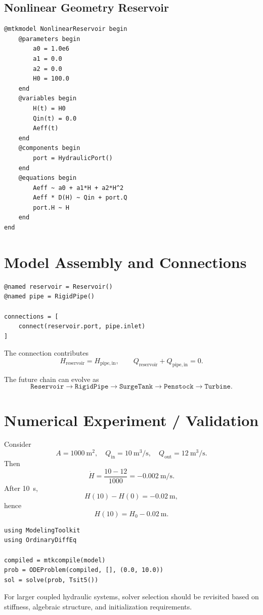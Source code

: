 \documentclass[11pt,a4paper]{article}
\begin{document}
\subsection{Nonlinear Geometry Reservoir}
\begin{lstlisting}
@mtkmodel NonlinearReservoir begin
    @parameters begin
        a0 = 1.0e6
        a1 = 0.0
        a2 = 0.0
        H0 = 100.0
    end
    @variables begin
        H(t) = H0
        Qin(t) = 0.0
        Aeff(t)
    end
    @components begin
        port = HydraulicPort()
    end
    @equations begin
        Aeff ~ a0 + a1*H + a2*H^2
        Aeff * D(H) ~ Qin + port.Q
        port.H ~ H
    end
end
\end{lstlisting}

\section{Model Assembly and Connections}
\begin{lstlisting}
@named reservoir = Reservoir()
@named pipe = RigidPipe()

connections = [
    connect(reservoir.port, pipe.inlet)
]
\end{lstlisting}

The connection contributes
\[
H_{\mathrm{reservoir}}=H_{\mathrm{pipe,in}},
\qquad
Q_{\mathrm{reservoir}}+Q_{\mathrm{pipe,in}}=0.
\]

The future chain can evolve as
\[
\boxed{\texttt{Reservoir}\rightarrow\texttt{RigidPipe}\rightarrow\texttt{SurgeTank}\rightarrow\texttt{Penstock}\rightarrow\texttt{Turbine}}.
\]

\section{Numerical Experiment / Validation}
Consider
\[
A=1000~\si{\meter\squared},\quad
Q_{\mathrm{in}}=10~\si{\meter\cubed\per\second},\quad
Q_{\mathrm{out}}=12~\si{\meter\cubed\per\second}.
\]
Then
\[
\dot H=\frac{10-12}{1000}=-0.002~\si{\meter\per\second}.
\]
After \SI{10}{\second},
\[
H(10)-H(0)=-0.02~\si{\meter},
\]
hence
\[
\boxed{H(10)=H_0-0.02~\si{\meter}}.
\]

\begin{lstlisting}
using ModelingToolkit
using OrdinaryDiffEq

compiled = mtkcompile(model)
prob = ODEProblem(compiled, [], (0.0, 10.0))
sol = solve(prob, Tsit5())
\end{lstlisting}

For larger coupled hydraulic systems, solver selection should be revisited based on stiffness, algebraic structure, and initialization requirements.
\end{document}

